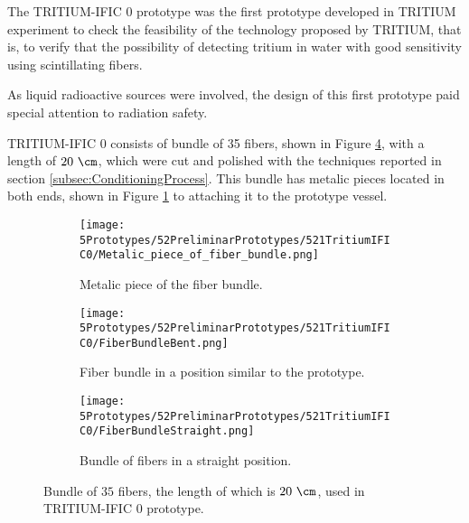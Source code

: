 The TRITIUM-IFIC 0 prototype was the first prototype developed in TRITIUM experiment to check the feasibility of the technology proposed by TRITIUM, that is, to verify that the possibility of detecting tritium in water with good sensitivity using scintillating fibers.

As liquid radioactive sources were involved, the design of this first prototype paid special attention to radiation safety.

TRITIUM-IFIC 0 consists of bundle of 35 fibers, shown in Figure \ref{fig:FiberBundleOfTritiumIFIC0}, with a length of $20~\cm$, which were cut and polished with the techniques reported in section \ref{subsec:ConditioningProcess}. This bundle has metalic pieces located in both ends, shown in Figure \ref{subfig:MetalicPieceFiberBunchTritiumIFIC0} to attaching it to the prototype vessel.

\begin{figure}
\centering
    \begin{subfigure}[b]{0.5\textwidth}
    \centering
    \texttt{[image: 5Prototypes/52PreliminarPrototypes/521TritiumIFIC0/Metalic\_piece\_of\_fiber\_bundle.png]}  
    \caption{Metalic piece of the fiber bundle. \label{subfig:MetalicPieceFiberBunchTritiumIFIC0}}
    \end{subfigure}
    \hfill
    \begin{subfigure}[b]{0.4\textwidth}
    \centering
    \texttt{[image: 5Prototypes/52PreliminarPrototypes/521TritiumIFIC0/FiberBundleBent.png]}  
    \caption{Fiber bundle in a position similar to the prototype.\label{subfig:FiberBunchTritiumIFIC0Bent}}
    \end{subfigure}
    \hfill
    \begin{subfigure}[b]{0.7\textwidth}
    \centering
    \texttt{[image: 5Prototypes/52PreliminarPrototypes/521TritiumIFIC0/FiberBundleStraight.png]}  
    \caption{Bundle of fibers in a straight position.\label{subfig:FiberBunchTritiumIFIC0}}
    \end{subfigure}
 \caption{Bundle of $35$ fibers, the length of which is $20~\cm$, used in TRITIUM-IFIC 0 prototype.}
 \label{fig:FiberBundleOfTritiumIFIC0}
\end{figure}

